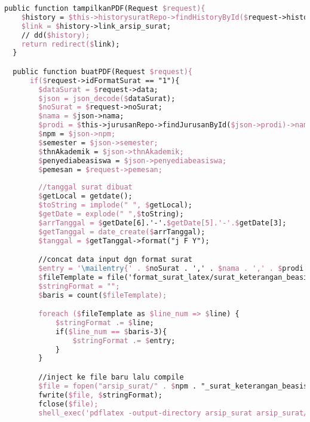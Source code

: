 \begin{lstlisting}[language=tex,basicstyle=\tiny,caption=HistorysuratController.php]
  public function tampilkanPDF(Request $request){
    $history = $this->historysuratRepo->findHistoryById($request->history_id);
    $link = $history->link_arsip_surat;
    // dd($history);
    return redirect($link); 
  }

  public function buatPDF(Request $request){
      if($request->idFormatSurat == "1"){
        $dataSurat = $request->data;
        $json = json_decode($dataSurat);
        $noSurat = $request->noSurat;
        $nama = $json->nama;
        $prodi = $this->jurusanRepo->findJurusanById($json->prodi)->nama_jurusan;
        $npm = $json->npm;
        $semester = $json->semester;
        $thnAkademik = $json->thnAkademik;
        $penyediabeasiswa = $json->penyediabeasiswa;
        $pemesan = $request->pemesan;
        
        //tanggal surat dibuat
        $getLocal = getdate();
        $toString = implode(" ", $getLocal);
        $getDate = explode(" ",$toString);
        $arrTanggal = $getDate[6].'-'.$getDate[5].'-'.$getDate[3];
        $getTanggal = date_create($arrTanggal);
        $tanggal = $getTanggal->format("j F Y");

        //concat data input dgn format surat
        $entry = '\mailentry{' . $noSurat . ',' . $nama . ',' . $prodi . ',' . $npm . ',' . $semester . ',' . $thnAkademik . ',' . $penyediabeasiswa . ',' . $tanggal . '}';
        $fileTemplate = file('format_surat_latex/surat_keterangan_beasiswa.tex');
        $stringFormat = "";
        $baris = count($fileTemplate);

        foreach ($fileTemplate as $line_num => $line) {
            $stringFormat .= $line;
            if($line_num == $baris-3){
                $stringFormat .= $entry;
            }
        }

        //inject ke file baru lalu compile
        $file = fopen("arsip_surat/" . $npm . "_surat_keterangan_beasiswa.tex", "w");
        fwrite($file, $stringFormat);
        fclose($file);
        shell_exec('pdflatex -output-directory arsip_surat arsip_surat/' . $npm . '_surat_keterangan_beasiswa.tex');


\end{lstlisting}
